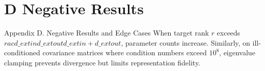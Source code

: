 \section{D Negative Results}

 Appendix D. Negative Results and Edge Cases
When target rank $r$ exceeds $
rac{d\_{	ext{in}} d\_{	ext{out}}}{d\_{	ext{in}} + d\_{	ext{out}}}$, parameter counts increase. Similarly, on ill-conditioned covariance matrices where condition numbers exceed $10^8$, eigenvalue clamping prevents divergence but limits representation fidelity.
